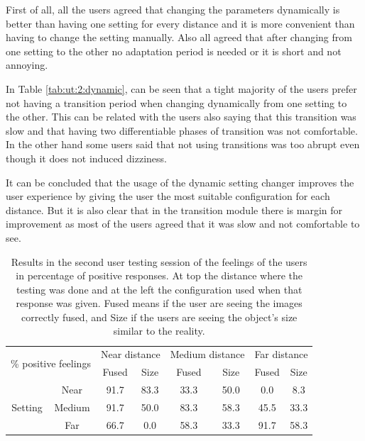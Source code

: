 \documentclass[10pt,a4paper,twocolumn,twoside]{article}
\begin{document}
	First of all, all the users agreed that changing the parameters dynamically is better than having one setting for every distance and it is more convenient than having to change the setting manually. Also all agreed that after changing from one setting to the other no adaptation period is needed or it is short and not annoying.  
	
	In Table \ref{tab:ut:2:dynamic}, can be seen that a tight majority of the users prefer not having a transition period when changing dynamically from one setting to the other. This can be related with the users also saying that this transition was slow and that having two differentiable phases of transition was not comfortable. In the other hand some users said that not using transitions was too abrupt even though it does not induced dizziness. 
	
	It can be concluded that the usage of the dynamic setting changer improves the user experience by giving the user the most suitable configuration for each distance. But it is also clear that in the transition module there is margin for improvement as most of the users agreed that it was slow and not comfortable to see.
	
	\begin{table}
		\centering
		\begin{tabular}{@{}cccccccc@{}}
			\toprule
			\multicolumn{2}{l}{\multirow{2}{*}{\% positive feelings}} & \multicolumn{2}{c}{Near distance} & \multicolumn{2}{c}{Medium distance} & \multicolumn{2}{c}{Far distance} \\
			\multicolumn{2}{l}{} & Fused & Size & Fused & Size & Fused & Size \\ \midrule
			\multirow{3}{*}{Setting} & Near & 91.7 & 83.3 & 33.3 & 50.0 & 0.0 & 8.3 \\
			& Medium & 91.7 & 50.0 & 83.3 & 58.3 & 45.5 & 33.3 \\
			& Far & 66.7 & 0.0 & 58.3 & 33.3 & 91.7 & 58.3 \\ \bottomrule
		\end{tabular}
		\caption{Results in the second user testing session of the feelings of the users in percentage of positive responses. At top the distance where the testing was done and at the left the configuration used when that response was given. Fused means if the user are seeing the images correctly fused, and Size if the users are seeing the object's size similar to the reality.}
		\label{tab:ut:2:feelings}
	\end{table}
\end{document}
